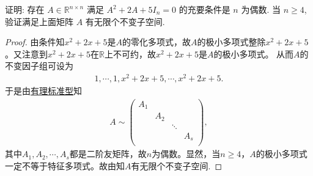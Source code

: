 \documentclass[../../main.tex]{subfiles}%
\begin{document}
\begin{example}
证明: 存在 \( A \in \mathbb{R}^{n \times n} \) 满足 \( A^2 + 2A + 5I_n = 0 \) 的充要条件是 \( n \) 为偶数. 当 \( n \geqslant 4 \), 验证满足上面矩阵 \( A \) 有无限个不变子空间.
\end{example}
\begin{proof}
由条件知$x^2+2x+5$是$A$的零化多项式，故$A$的极小多项式整除$x^2+2x+5$。又注意到$x^2+2x+5$在$\mathbb{R}$上不可约，故$x^2+2x+5$是$A$的极小多项式。
从而$A$的不变因子组可设为
\begin{align*}
1,\cdots ,1,x^2+2x+5,\cdots ,x^2+2x+5.
\end{align*}
于是由\hyperref[theorem:有理标准型核心定理]{有理标准型}知
\begin{align*}
A\sim \begin{pmatrix}
A_1&		&		&		\\
&		A_2&		&		\\
&		&		\ddots&		\\
&		&		&		A_s\\
\end{pmatrix},
\end{align*}
其中$A_1,A_2,\cdots ,A_s$都是二阶友矩阵，故$n$为偶数。显然，当$n\geqslant 4$，$A$的极小多项式一定不等于特征多项式。故由知$A$有无限个不变子空间.
\end{proof}
\end{document}
